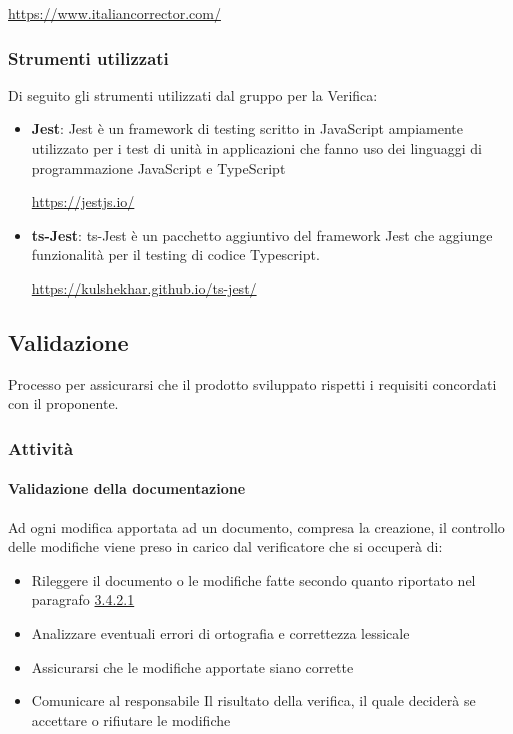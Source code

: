 \documentclass[12pt]{article}
\begin{document}
     \url{https://www.italiancorrector.com/}

\subsubsection{Strumenti utilizzati}
Di seguito gli strumenti utilizzati dal gruppo per la Verifica:
\begin{itemize}
    \item \textbf{Jest}: Jest è un framework di testing scritto in JavaScript ampiamente utilizzato per i test di unità in applicazioni che fanno uso dei linguaggi di programmazione JavaScript e TypeScript
          \begin{center}
              \url{https://jestjs.io/}
          \end{center}
    \item \textbf{ts-Jest}: ts-Jest è un pacchetto aggiuntivo del framework Jest che aggiunge funzionalità per il testing di codice Typescript.
          \begin{center}
              \url{https://kulshekhar.github.io/ts-jest/}
          \end{center}
\end{itemize}

\label{Validazione}
\subsection{Validazione}
Processo per assicurarsi che il prodotto sviluppato rispetti i requisiti concordati con il proponente.

\subsubsection{Attività}
\paragraph{Validazione della documentazione}
Ad ogni modifica apportata ad un documento, compresa la creazione, il controllo delle modifiche viene preso in carico dal verificatore che si occuperà di:
\begin{itemize}
    \item Rileggere il documento o le modifiche fatte secondo quanto riportato nel paragrafo \hyperref[VerificaDocumento]{3.4.2.1}
    \item Analizzare eventuali errori di ortografia e correttezza lessicale
    \item Assicurarsi che le modifiche apportate siano corrette
    \item Comunicare al responsabile Il risultato della verifica, il quale deciderà se accettare o rifiutare le modifiche
\end{itemize} 
\end{document}

